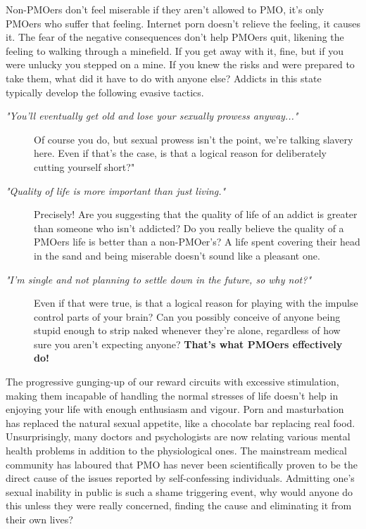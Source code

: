 \documentclass[easypeasy.tex]{subfiles}
\begin{document}
Non-PMOers don't feel miserable if they aren't allowed to PMO, it's only PMOers who suffer that feeling. Internet porn doesn't relieve the feeling, it causes it. The fear of the negative consequences don't help PMOers quit, likening the feeling to walking through a minefield. If you get away with it, fine, but if you were unlucky you stepped on a mine. If you knew the risks and were prepared to take them, what did it have to do with anyone else? Addicts in this state typically develop the following evasive tactics.
\begin{description}
  \item [\textit{"You'll eventually get old and lose your sexually prowess anyway..."}] Of course you do, but sexual prowess isn't the point, we're talking slavery here. Even if that's the case, is that a logical reason for deliberately cutting yourself short?"

  \item  [ \textit{"Quality of life is more important than just living."}] Precisely! Are you suggesting that the quality of life of an addict is greater than someone who isn't addicted? Do you really believe the quality of a PMOers life is better than a non-PMOer's? A life spent covering their head in the sand and being miserable doesn't sound like a pleasant one.

  \item [\textit{"I'm single and not planning to settle down in the future, so why not?"}] Even if that were true, is that a logical reason for playing with the impulse control parts of your brain? Can you possibly conceive of anyone being stupid enough to strip naked whenever they're alone, regardless of how sure you aren't expecting anyone? \textbf{That's what PMOers effectively do!}
\end{description}

The progressive gunging-up of our reward circuits with excessive stimulation, making them incapable of handling the normal stresses of life doesn't help in enjoying your life with enough enthusiasm and vigour. Porn and masturbation has replaced the natural sexual appetite, like a chocolate bar replacing real food. Unsurprisingly, many doctors and psychologists are now relating various mental health problems in addition to the physiological ones. The mainstream medical community has laboured that PMO has never been scientifically proven to be the direct cause of the issues reported by self-confessing individuals. Admitting one's sexual inability in public is such a shame triggering event, why would anyone do this unless they were really concerned, finding the cause and eliminating it from their own lives?
\end{document}
